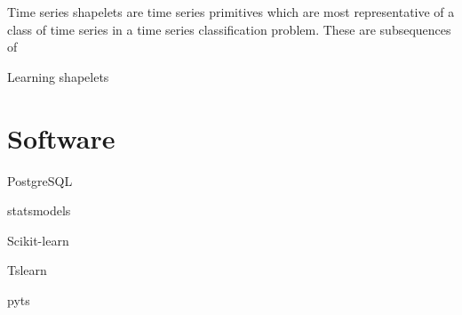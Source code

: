 Time series shapelets \citep{DBLP:conf/kdd/YeK09} are time series primitives which are most representative of a class of time series in a time series classification problem.
These are subsequences of

Learning shapelets \citep{DBLP:conf/kdd/GrabockaSWS14}

\section{Software}

PostgreSQL \citep{postgresql}

statsmodels \citep{statsmodels}

Scikit-learn \citep{DBLP:journals/jmlr/PedregosaVGMTGBPWDVPCBPD11}

Tslearn \citep{DBLP:journals/jmlr/TavenardFVDAHPY20}

pyts \citep{DBLP:journals/jmlr/FaouziJ20}
